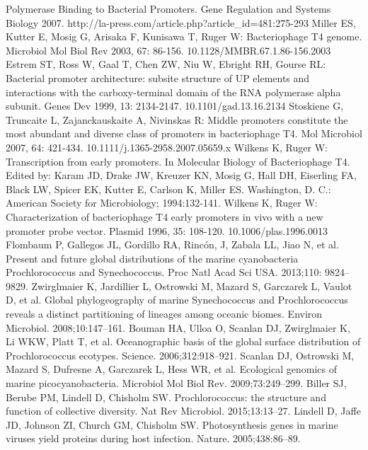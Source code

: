 \documentclass[14pt]{extarticle}
\begin{document}
\begin{thebibliography}{9}
    Polymerase Binding to Bacterial Promoters. Gene Regulation and Systems Biology 2007. 
    http://la-press.com/article.php?article\_id=481:275-293
     Miller ES, Kutter E, Mosig G, Arisaka F, Kunisawa T, Ruger W: Bacteriophage T4 genome. Microbiol Mol 
    Biol Rev 2003, 67: 86-156. 10.1128/MMBR.67.1.86-156.2003
     Estrem ST, Ross W, Gaal T, Chen ZW, Niu W, Ebright RH, Gourse RL: Bacterial promoter architecture: 
    subsite structure of UP elements and interactions with the carboxy-terminal domain of the RNA polymerase alpha 
    subunit. Genes Dev 1999, 13: 2134-2147. 10.1101/gad.13.16.2134
     Stoskiene G, Truncaite L, Zajanckauskaite A, Nivinskas R: Middle promoters constitute the most abundant
    and diverse class of promoters in bacteriophage T4. Mol Microbiol 2007, 64: 421-434. 
    10.1111/j.1365-2958.2007.05659.x
     Wilkens K, Ruger W: Transcription from early promoters. In Molecular Biology of Bacteriophage T4. Edited
    by: Karam JD, Drake JW, Kreuzer KN, Mosig G, Hall DH, Eiserling FA, Black LW, Spicer EK, Kutter E, Carlson K, Miller
    ES. Washington, D. C.: American Society for Microbiology; 1994:132-141.
     Wilkens K, Ruger W: Characterization of bacteriophage T4 early promoters in vivo with a new promoter 
    probe vector. Plasmid 1996, 35: 108-120. 10.1006/plas.1996.0013
     Flombaum P, Gallegos JL, Gordillo RA, Rincón, J, Zabala LL, Jiao N, et al. Present and future global 
    distributions of the marine cyanobacteria Prochlorococcus and Synechococcus. Proc Natl Acad Sci USA. 2013;110: 
    9824–9829.
     Zwirglmaier K, Jardillier L, Ostrowski M, Mazard S, Garczarek L, Vaulot D, et al. Global phylogeography
    of marine Synechococcus and Prochlorococcus reveals a distinct partitioning of lineages among oceanic biomes.
    Environ Microbiol. 2008;10:147–161.
     Bouman HA, Ulloa O, Scanlan DJ, Zwirglmaier K, Li WKW, Platt T, et al. Oceanographic basis of the 
    global surface distribution of Prochlorococcus ecotypes. Science. 2006;312:918–921.
     Scanlan DJ, Ostrowski M, Mazard S, Dufresne A, Garczarek L, Hess WR, et al. Ecological genomics of 
    marine picocyanobacteria. Microbiol Mol Biol Rev. 2009;73:249–299.
     Biller SJ, Berube PM, Lindell D, Chisholm SW. Prochlorococcus: the structure and function of collective
    diversity. Nat Rev Microbiol. 2015;13:13–27.
     Lindell D, Jaffe JD, Johnson ZI, Church GM, Chisholm SW. Photosynthesis genes in marine viruses yield 
    proteins during host infection. Nature. 2005;438:86–89.

\end{thebibliography}
\end{document}
